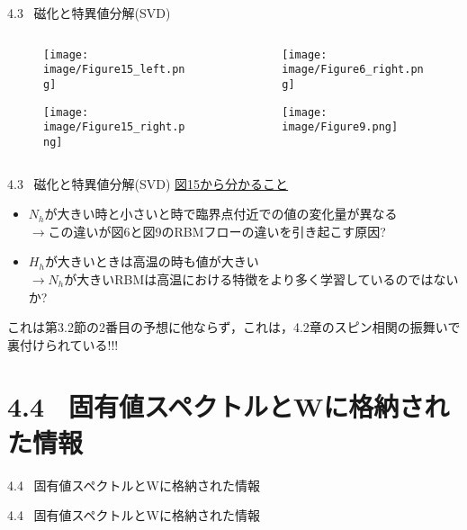 \documentclass[dvipdfmx,8pt]{beamer}
\begin{document}
\begin{frame}[t]{4.3 \ 磁化と特異値分解(SVD)}
  \begin{columns}
    \begin{column}{0.5\textwidth}
      \begin{figure}
        \begin{center}
          \texttt{[image: image/Figure15\_left.png]}
        \end{center}
      \end{figure}
      \begin{figure}
        \begin{center}
          \texttt{[image: image/Figure15\_right.png]}
        \end{center}
      \end{figure}
    \end{column}
    \begin{column}{0.5\textwidth}
      \begin{figure}
        \begin{center}
          \texttt{[image: image/Figure6\_right.png]}
        \end{center}
      \end{figure}
      \begin{figure}
        \begin{center}
          \texttt{[image: image/Figure9.png]}
        \end{center}
      \end{figure}
    \end{column}
  \end{columns}
\end{frame}

\begin{frame}[t]{4.3 \ 磁化と特異値分解(SVD)}
  \underline{図15から分かること}
  \vspace{0.2cm}
  \begin{itemize}
    \item $N_h$が大きい時と小さいと時で臨界点付近での値の変化量が異なる\\
    \vspace{0.2cm}
    $\rightarrow$この違いが図6と図9のRBMフローの違いを引き起こす原因?
    \item $H_h$が大きいときは高温の時も値が大きい\\
    \vspace{0.2cm}
    $\rightarrow$$N_h$が大きいRBMは高温における特徴をより多く学習しているのではないか?
  \end{itemize}
  \vspace{0.2cm}
  これは第3.2節の2番目の予想に他ならず，これは，4.2章のスピン相関の振舞いで裏付けられている!!!
\end{frame}

\section{4.4 \ 固有値スペクトルとWに格納された情報}
\begin{frame}[t]{4.4 \ 固有値スペクトルとWに格納された情報}

\end{frame}

\begin{frame}[t]{4.4 \ 固有値スペクトルとWに格納された情報}

\end{frame}
\end{document}
